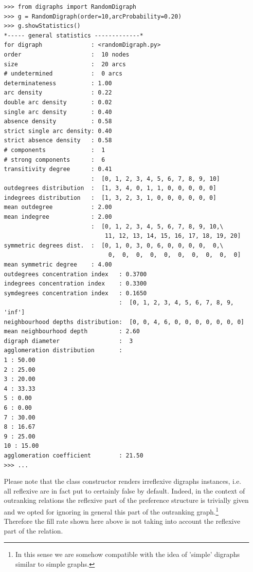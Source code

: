\documentclass{article}
\newcommand{\+}{\verb+}
\renewcommand{\*}{\back{}}
\begin{document}
\begin{center}
\begin{example}
\begin{verbatim}
>>> from digraphs import RandomDigraph
>>> g = RandomDigraph(order=10,arcProbability=0.20)
>>> g.showStatistics()
*----- general statistics -------------*
for digraph              : <randomDigraph.py>
order                    :  10 nodes
size                     :  20 arcs
# undetermined           :  0 arcs
determinateness          : 1.00
arc density              : 0.22
double arc density       : 0.02
single arc density       : 0.40
absence density          : 0.58
strict single arc density: 0.40
strict absence density   : 0.58
# components             :  1
# strong components      :  6
transitivity degree      : 0.41
                         :  [0, 1, 2, 3, 4, 5, 6, 7, 8, 9, 10]
outdegrees distribution  :  [1, 3, 4, 0, 1, 1, 0, 0, 0, 0, 0]
indegrees distribution   :  [1, 3, 2, 3, 1, 0, 0, 0, 0, 0, 0]
mean outdegree           : 2.00
mean indegree            : 2.00
                         :  [0, 1, 2, 3, 4, 5, 6, 7, 8, 9, 10,\
                             11, 12, 13, 14, 15, 16, 17, 18, 19, 20]
symmetric degrees dist.  :  [0, 1, 0, 3, 0, 6, 0, 0, 0, 0,  0,\
                              0,  0,  0,  0,  0,  0,  0,  0,  0,  0]
mean symmetric degree    : 4.00
outdegrees concentration index   : 0.3700
indegrees concentration index    : 0.3300
symdegrees concentration index   : 0.1650
                                 :  [0, 1, 2, 3, 4, 5, 6, 7, 8, 9, 'inf']
neighbourhood depths distribution:  [0, 0, 4, 6, 0, 0, 0, 0, 0, 0, 0]
mean neighbourhood depth         : 2.60 
digraph diameter                 :  3
agglomeration distribution       : 
1 : 50.00
2 : 25.00
3 : 20.00
4 : 33.33
5 : 0.00
6 : 0.00
7 : 30.00
8 : 16.67
9 : 25.00
10 : 15.00
agglomeration coefficient        : 21.50
>>> ...
\end{verbatim}
\end{example}

Please note that the  class constructor renders irreflexive digraphs instances, i.e. all reflexive  are in fact put to certainly false by default. Indeed, in the context of outranking relations the reflexive part of the preference structure is trivially given and we opted for ignoring in general this part of the outranking graph.\footnote{In this sense we are somehow compatible with the idea of 'simple' digraphs similar to simple graphs.} Therefore the fill rate shown here above is not taking into account the reflexive part of the relation.  


\end{center}
\end{document}

